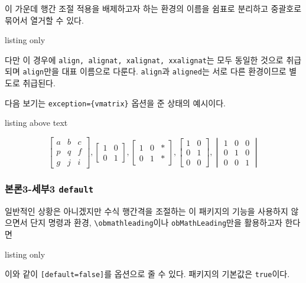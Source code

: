 \documentclass[a4paper,amsmath]{oblivoir}
\begin{document}
이 가운데 행간 조절 적용을 배제하고자 하는 환경의 이름을 쉼표로 분리하고 중괄호로 묶어서 열거할 수 있다.

\begin{tcblisting}{listing only}
    \usepackage[exception={cases,vmatrix}]{ob-mathleading}
\end{tcblisting}

다만 이 경우에 \texttt{align, alignat, xalignat, xxalignat}는 모두 동일한
것으로 취급되며 \texttt{align}만을 대표 이름으로 다룬다. \texttt{align}과 \texttt{aligned}는
서로 다른 환경이므로 별도로 취급된다.

다음 보기는 \verb|exception={vmatrix}| 옵션을 준 상태의 예시이다.

\begin{tcblisting}{listing above text}
    \begin{obMathLeading}
        \[
            \begin{bmatrix} a & b & c \\ p & q & f \\ g & j & i \end{bmatrix},
            \begin{bmatrix} 1 & 0 \\ 0 & 1\end{bmatrix},
            \begin{bmatrix} 1 & 0 & \ast\! \\ 0 & 1 & \ast\! \end{bmatrix},
            \begin{bmatrix} 1 & 0 \\ 0 & 1 \\ 0 & 0 \end{bmatrix},
            \begin{vmatrix} 1 & 0 & 0 \\ 0 & 1 & 0 \\ 0 & 0 & 1 \end{vmatrix}
        \]
    \end{obMathLeading}
\end{tcblisting}

\subsubsection{본론3-세부3  \texttt{default}}

일반적인 상황은 아니겠지만 수식 행간격을 조절하는 이 패키지의 기능을 사용하지 않으면서 단지 명령과 환경, \verb|\obmathleading|이나
\verb|obMathLeading|만을 활용하고자 한다면
\begin{tcblisting}{listing only}
    \usepackage[default=false]{ob-mathleading}
\end{tcblisting}
이와 같이 \verb|[default=false]|를 옵션으로 줄 수 있다. 패키지의 기본값은 \verb|true|이다.
\end{document}
